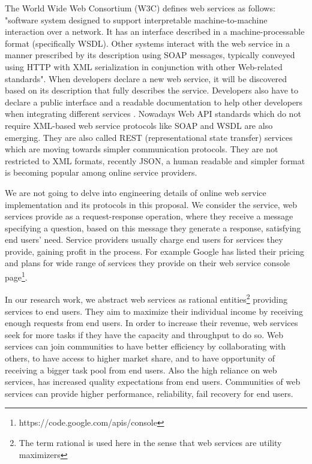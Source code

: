         The World Wide Web Consortium (W3C) defines web services as follows: "software
        system designed to support interpretable machine-to-machine interaction over a network.
        It has an interface described in a machine-processable format (specifically WSDL). Other
        systems interact with the web service in a manner prescribed by its description using
        SOAP messages, typically conveyed using HTTP with XML serialization in conjunction
        with other Web-related standards". When developers declare a new web service, it will
        be discovered based on its description that fully describes the service. Developers also
        have to declare a public interface and a readable documentation to help other developers
        when integrating different services \cite{w3cwsdl}. Nowadays Web API standards which do not
        require XML-based web service protocols like SOAP and WSDL are also emerging. They are also called
        REST (representational state transfer) services which are moving towards simpler communication protocols.
        They are not restricted to XML formats, recently JSON, a human readable and simpler format is becoming popular among online service providers.

        We are not going to delve into engineering details of online web service implementation and its protocols in this proposal.
        We consider the service, web services provide as a request-response operation, where they receive a message specifying a question,
        based on this message they generate a response, satisfying end users' need. Service providers usually charge end users for services they provide,
        gaining profit in the process. For example Google has listed their pricing and plans for wide range of services they provide
        on their web service console page\footnote{https://code.google.com/apis/console}.

        In our research work, we abstract web services as rational entities\footnote{The term
        rational is used here in the sense that web services are utility
        maximizers} providing services to end users. They aim to maximize
        their individual income by receiving enough requests from end
        users. In order to increase their revenue, web services seek for
        more tasks if they have the capacity and throughput to do so. Web
        services can join communities to have better efficiency by
        collaborating with others, to have access to higher market share,
        and to have opportunity of receiving a bigger task pool from end
        users. Also the high reliance on web services, has increased quality expectations from end users.
        Communities of web services can provide higher performance, reliability, fail recovery for end users.

